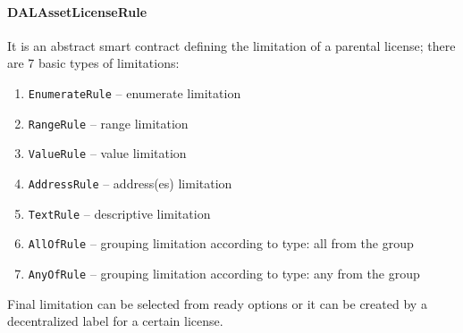 \documentclass[12pt]{report}
\def\code#1{\colorbox{light-gray}{\texttt{#1}}}
\begin{document}
\paragraph{DALAssetLicenseRule}\hfill\null\linebreak
\begin{multicols}{2}
It is an abstract smart contract defining the limitation of a parental license; there are 7 basic types of limitations:
\begin{enumerate}
	\item \code{EnumerateRule} – enumerate limitation
	\item \code{RangeRule} – range limitation
	\item \code{ValueRule} – value limitation
	\item \code{AddressRule} – address(es) limitation
	\item \code{TextRule} – descriptive limitation
	\item \code{AllOfRule} – grouping limitation according to type: all from the group
	\item \code{AnyOfRule} – grouping limitation according to type: any from the group
\end{enumerate}

Final limitation can be selected from ready options or it can be created by a decentralized label for a certain license.
\end{multicols}
\end{document}
